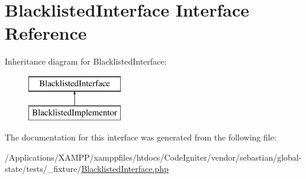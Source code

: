 \hypertarget{interface_sebastian_bergmann_1_1_global_state_1_1_test_fixture_1_1_blacklisted_interface}{}\section{Blacklisted\+Interface Interface Reference}
\label{interface_sebastian_bergmann_1_1_global_state_1_1_test_fixture_1_1_blacklisted_interface}
Inheritance diagram for Blacklisted\+Interface\+:\begin{figure}[H]
\begin{center}
\leavevmode
\includegraphics[height=2.000000cm]{interface_sebastian_bergmann_1_1_global_state_1_1_test_fixture_1_1_blacklisted_interface}
\end{center}
\end{figure}


The documentation for this interface was generated from the following file\+:\begin{DoxyCompactItemize}
\item 
/\+Applications/\+X\+A\+M\+P\+P/xamppfiles/htdocs/\+Code\+Igniter/vendor/sebastian/global-\/state/tests/\+\_\+fixture/\mbox{\hyperlink{_blacklisted_interface_8php}{Blacklisted\+Interface.\+php}}\end{DoxyCompactItemize}
